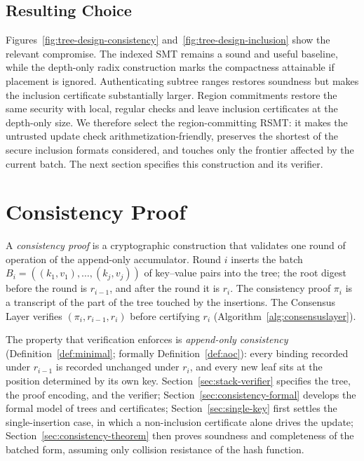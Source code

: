 \documentclass[11pt]{article}
\begin{document}
\subsection{Resulting Choice}

Figures~\ref{fig:tree-design-consistency} and~\ref{fig:tree-design-inclusion} show the relevant compromise. The indexed SMT remains a sound and useful baseline, while the depth-only radix construction marks the compactness attainable if placement is ignored. Authenticating subtree ranges restores soundness but makes the inclusion certificate substantially larger. Region commitments restore the same security with local, regular checks and leave inclusion certificates at the depth-only size. We therefore select the region-committing RSMT: it makes the untrusted update check arithmetization-friendly, preserves the shortest of the secure inclusion formats considered, and touches only the frontier affected by the current batch. The next section specifies this construction and its verifier.

\section{Consistency Proof}
\label{sec:consistency-proof}

A \emph{consistency proof} is a cryptographic construction that validates one round of operation of the append-only accumulator. Round $i$ inserts the batch $B_i = ((k_1, v_1), \ldots, (k_j, v_j))$ of key--value pairs into the tree; the root digest before the round is $r_{i-1}$, and after the round it is $r_i$. The consistency proof $\pi_i$ is a transcript of the part of the tree touched by the insertions. The Consensus Layer verifies $(\pi_i, r_{i-1}, r_i)$ before certifying $r_i$ (Algorithm~\ref{alg:consensuslayer}).

The property that verification enforces is \emph{append-only consistency} (Definition~\ref{def:minimal}; formally Definition~\ref{def:aoc}): every binding recorded under $r_{i-1}$ is recorded unchanged under $r_i$, and every new leaf sits at the position determined by its own key. Section~\ref{sec:stack-verifier} specifies the tree, the proof encoding, and the verifier; Section~\ref{sec:consistency-formal} develops the formal model of trees and certificates; Section~\ref{sec:single-key} first settles the single-insertion case, in which a non-inclusion certificate alone drives the update; Section~\ref{sec:consistency-theorem} then proves soundness and completeness of the batched form, assuming only collision resistance of the hash function.
\end{document}
